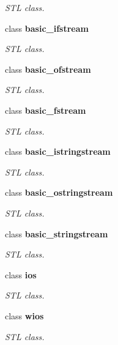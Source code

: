 \begin{DoxyCompactItemize}
\begin{DoxyCompactList}\small\item\em STL class. \item\end{DoxyCompactList}\item 
class {\bfseries basic\_\-ifstream}
\begin{DoxyCompactList}\small\item\em STL class. \item\end{DoxyCompactList}\item 
class {\bfseries basic\_\-ofstream}
\begin{DoxyCompactList}\small\item\em STL class. \item\end{DoxyCompactList}\item 
class {\bfseries basic\_\-fstream}
\begin{DoxyCompactList}\small\item\em STL class. \item\end{DoxyCompactList}\item 
class {\bfseries basic\_\-istringstream}
\begin{DoxyCompactList}\small\item\em STL class. \item\end{DoxyCompactList}\item 
class {\bfseries basic\_\-ostringstream}
\begin{DoxyCompactList}\small\item\em STL class. \item\end{DoxyCompactList}\item 
class {\bfseries basic\_\-stringstream}
\begin{DoxyCompactList}\small\item\em STL class. \item\end{DoxyCompactList}\item 
class {\bfseries ios}
\begin{DoxyCompactList}\small\item\em STL class. \item\end{DoxyCompactList}\item 
class {\bfseries wios}
\begin{DoxyCompactList}\small\item\em STL class. \item\end{DoxyCompactList}\item 

\end{DoxyCompactItemize}
